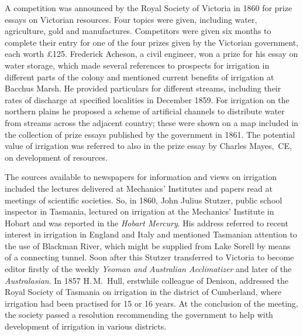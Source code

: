 A competition was announced by the Royal Society of Victoria in 1860
for prize essays on Victorian resources. Four topics were given,
including water, agriculture, gold and manufactures. Competitors were
given six months to complete their entry for one of the four prizes
given by the Victorian government, each worth \pounds125. Frederick
Acheson,  a civil engineer, won a prize for his
essay on water storage, which made several references to prospects for
irrigation in different parts of the colony and mentioned current
benefits of irrigation at Bacchus Marsh. 
He provided particulars for different streams, including their rates
of discharge at specified localities in December 1859.  For irrigation
on the northern plains he proposed a scheme of artificial
channels to distribute water from
streams across the adjacent country; these were shown on a map
included in the collection of prize essays published by the government
in 1861.  The potential value of irrigation was referred to also in
the prize essay by Charles Mayes,~CE,
 on
development of resources.

The sources available to newspapers for information and views on
irrigation included the lectures delivered at Mechanics' Institutes
 and papers read at meetings of scientific
societies.  So, in 1860, John Julius Stutzer, 
public school inspector in Tasmania, lectured on irrigation at the
Mechanics' Institute in Hobart and was reported in the \textit{Hobart
Mercury}. His address referred to recent interest in irrigation in
England and Italy and mentioned Tasmanian attention to
the use of Blackman River,  which might be
supplied from Lake Sorell  by means of a connecting
tunnel.  Soon after this Stutzer
transferred to Victoria to become editor firstly of the weekly
\textit{Yeoman and Australian Acclimatizer} and later of the
\textit{Australasian}.  In 1857 H.\,M.~Hull, 
erstwhile colleague of Denison, addressed the Royal Society of
Tasmania  on irrigation in the district
of Cumberland, where irrigation had been practised for 15 or 16 years.
At the conclusion of the meeting, the society passed a resolution
recommending the government to help with development of irrigation in
various districts.

